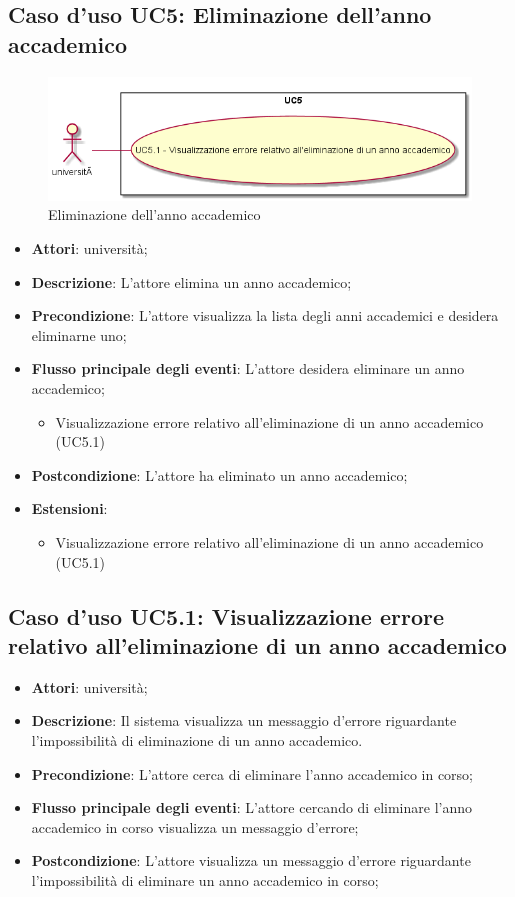 \subsection{Caso d'uso \texorpdfstring{UC5}{UC5}: Eliminazione dell'anno accademico}
\begin{figure} [H]
\centering
\includegraphics[scale=0.45]{./img/UC5.png}
\caption{Eliminazione dell'anno accademico}\label{}
\end{figure}
\begin{itemize}
\item \textbf{Attori}: università;
\item \textbf{Descrizione}: L'attore elimina un anno accademico;
\item \textbf{Precondizione}: L'attore visualizza la lista degli anni accademici e desidera eliminarne uno;
\item \textbf{Flusso principale degli eventi}: L'attore desidera eliminare un anno accademico;
\begin{itemize}
\item Visualizzazione errore relativo all'eliminazione di un anno accademico (UC5.1)
\end{itemize}
\item \textbf{Postcondizione}: L'attore ha eliminato un anno accademico;
\item \textbf{Estensioni}:
\begin{itemize}
\item Visualizzazione errore relativo all'eliminazione di un anno accademico (UC5.1)
\end{itemize}
\end{itemize}
\subsection{Caso d'uso \texorpdfstring{UC5.1}{UC5.1}: Visualizzazione errore relativo all'eliminazione di un anno accademico}
\begin{itemize}
\item \textbf{Attori}: università;
\item \textbf{Descrizione}: Il sistema visualizza un messaggio d'errore riguardante l'impossibilità di eliminazione di un anno accademico.
\item \textbf{Precondizione}: L'attore cerca di eliminare l'anno accademico in corso;
\item \textbf{Flusso principale degli eventi}: L'attore cercando di eliminare l'anno accademico in corso visualizza un messaggio d'errore;
\item \textbf{Postcondizione}: L'attore visualizza un messaggio d'errore riguardante l'impossibilità di eliminare un anno accademico in corso;
\end{itemize}
